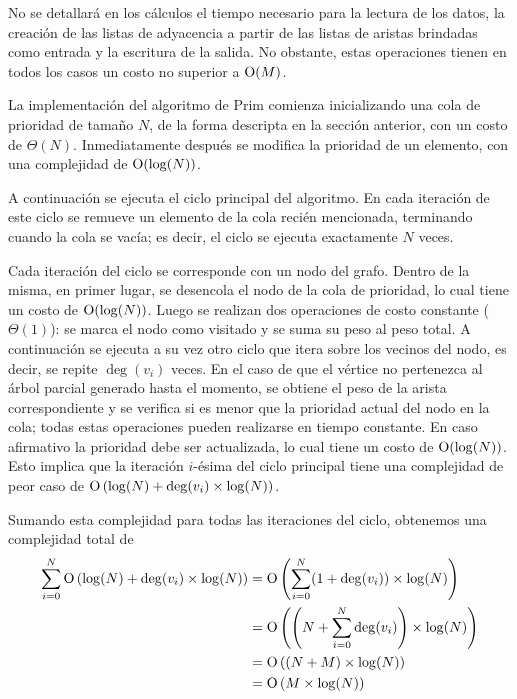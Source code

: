     No se detallará en los cálculos el tiempo necesario para la lectura de
    los datos, la creación de las listas de adyacencia a partir de las listas
    de aristas brindadas como entrada y la escritura de la salida. No
    obstante, estas operaciones tienen en todos los casos un costo no
    superior a $\operatorname{O}(M)$.

    \vspace{1.25em}

    La implementación del algoritmo de Prim comienza inicializando una cola
    de prioridad de tamaño $N$, de la forma descripta en la sección anterior,
    con un costo de $\Theta(N)$. Inmediatamente después se modifica la
    prioridad de un elemento, con una complejidad de $\operatorname{O}(\log(N))$.

    A continuación se ejecuta el ciclo principal del algoritmo. En cada
    iteración de este ciclo se remueve un elemento de la cola recién
    mencionada, terminando cuando la cola se vacía; es decir, el ciclo se
    ejecuta exactamente $N$ veces.

    Cada iteración del ciclo se corresponde con un nodo del grafo. Dentro de
    la misma, en primer lugar, se desencola el nodo de la cola de prioridad,
    lo cual tiene un costo de $\operatorname{O}(\log(N))$. Luego se realizan dos
    operaciones de costo constante ($\Theta(1)$): se marca el nodo como
    visitado y se suma su peso al peso total. A continuación se ejecuta a su
    vez otro ciclo que itera sobre los vecinos del nodo, es decir, se repite
    $\operatorname{deg}(v_i)$ veces. En el caso de que el vértice no
    pertenezca al árbol parcial generado hasta el momento, se obtiene
    el peso de la arista correspondiente y se verifica si es menor
    que la prioridad actual del nodo en la cola; todas estas operaciones
    pueden realizarse en tiempo constante. En caso afirmativo la prioridad
    debe ser actualizada, lo cual tiene un costo de $\operatorname{O}(\log(N))$. Esto
    implica que la iteración $i$-ésima del ciclo principal tiene una
    complejidad de peor caso de
    $\operatorname{O} \left(\log(N) + \operatorname{deg}(v_i) \times \log(N) \right)$.

    Sumando esta complejidad para todas las iteraciones del ciclo, obtenemos
    una complejidad total de
    \[ \begin{aligned}
    \sum_{i=0}^{N} \operatorname{O} \left( \log(N) + \operatorname{deg}(v_i)
        \times \log(N) \right)
            &= \operatorname{O} \left( \sum_{i=0}^{N} (1+\operatorname{deg}(v_i))
                \times \log(N) \right) \\
            &= \operatorname{O} \left( \left( N + \sum_{i=0}^{N}
                \operatorname{deg}(v_i) \right) \times \log(N) \right) \\
            &= \operatorname{O} \left( (N + M) \times \log(N) \right) \\
            &= \operatorname{O} \left( M \times \log(N) \right)
    \end{aligned} \]

